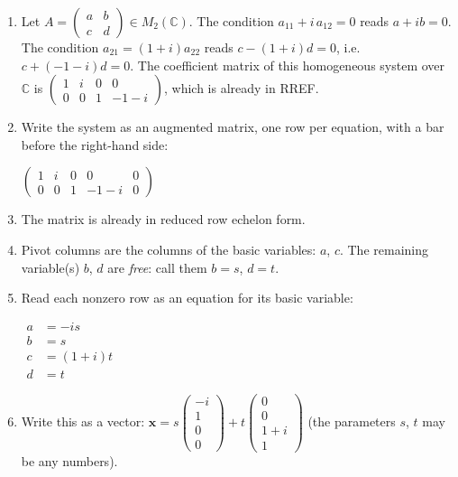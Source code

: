 \documentclass[11pt]{article}
\begin{document}
\begin{tcolorbox}[breakable,colback=ans,colframe=ansb,boxrule=0.5pt,left=4pt,right=4pt,top=2pt,bottom=2pt]\begin{enumerate}[leftmargin=3.1em,itemsep=1pt,topsep=1pt,label=\textbf{Step \arabic*.}]\item Let $A=\begin{pmatrix}a&b\\c&d\end{pmatrix}\in M_2(\mathbb{C})$. The condition $a_{11}+i\,a_{12}=0$ reads $a+ib=0$. The condition $a_{21}=(1+i)a_{22}$ reads $c-(1+i)d=0$, i.e.\ $c+(-1-i)d=0$. The coefficient matrix of this homogeneous system over $\mathbb{C}$ is $\begin{pmatrix}1&i&0&0\\0&0&1&-1-i\end{pmatrix}$, which is already in RREF.
\item Write the system as an augmented matrix, one row per equation, with a bar before the right-hand side:\par\smallskip $\displaystyle \left(\begin{array}{cccc|c}1 & i & 0 & 0 & 0 \\ 0 & 0 & 1 & -1-i & 0\end{array}\right)$
\item The matrix is already in reduced row echelon form.
\item Pivot columns are the columns of the basic variables: $a$, $c$. The remaining variable(s) $b$, $d$ are \emph{free}: call them $b=s$, $d=t$.
\item Read each nonzero row as an equation for its basic variable:\par\smallskip $\displaystyle\begin{aligned}a&=-is\\ b&=s\\ c&=(1+i)t\\ d&=t\end{aligned}$
\item Write this as a vector: $\displaystyle \mathbf x=s\begin{pmatrix}-i\\1\\0\\0\end{pmatrix}+t\begin{pmatrix}0\\0\\1+i\\1\end{pmatrix}$ (the parameters $s$, $t$ may be any numbers).

\end{enumerate}
\end{tcolorbox}
\end{document}

